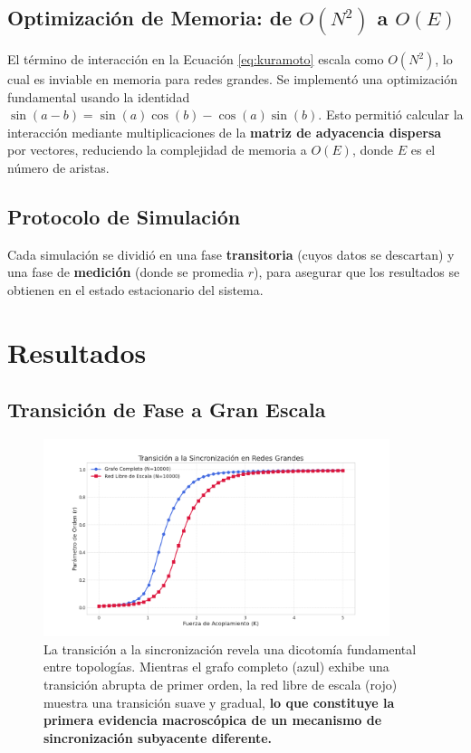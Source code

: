 \documentclass[12pt, a4paper]{article}
\begin{document}
\subsection{Optimización de Memoria: de \(O(N^2)\) a \(O(E)\)}
El término de interacción en la Ecuación \ref{eq:kuramoto} escala como \(O(N^2)\), lo cual es inviable en memoria para redes grandes. Se implementó una optimización fundamental usando la identidad \(\sin(a-b) = \sin(a)\cos(b) - \cos(a)\sin(b)\). Esto permitió calcular la interacción mediante multiplicaciones de la \textbf{matriz de adyacencia dispersa} por vectores, reduciendo la complejidad de memoria a \(O(E)\), donde \(E\) es el número de aristas.

\subsection{Protocolo de Simulación}
Cada simulación se dividió en una fase \textbf{transitoria} (cuyos datos se descartan) y una fase de \textbf{medición} (donde se promedia \(r\)), para asegurar que los resultados se obtienen en el estado estacionario del sistema.

\section{Resultados}

\subsection{Transición de Fase a Gran Escala}
\begin{figure}[H]
    \centering
    \includegraphics[width=0.9\textwidth]{img/1.png}
    \caption{La transición a la sincronización revela una dicotomía fundamental entre topologías. Mientras el grafo completo (azul) exhibe una transición abrupta de primer orden, la red libre de escala (rojo) muestra una transición suave y gradual, \textbf{lo que constituye la primera evidencia macroscópica de un mecanismo de sincronización subyacente diferente.}}
    \label{fig:r_vs_k}
\end{figure}
\end{document}
